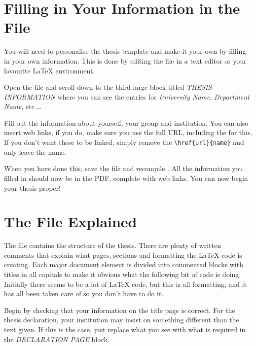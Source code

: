 
\section{Filling in Your Information in the  File}\label{FillingFile}

You will need to personalise the thesis template and make it your own by filling in your own information. This is done by editing the  file in a text editor or your favourite LaTeX environment.

Open the file and scroll down to the third large block titled \emph{THESIS INFORMATION} where you can see the entries for \emph{University Name}, \emph{Department Name}, etc \ldots

Fill out the information about yourself, your group and institution. You can also insert web links, if you do, make sure you use the full URL, including the  for this. If you don't want these to be linked, simply remove the \verb|\href{url}{name}| and only leave the name.

When you have done this, save the file and recompile . All the information you filled in should now be in the PDF, complete with web links. You can now begin your thesis proper!


\section{The  File Explained}

The  file contains the structure of the thesis. There are plenty of written comments that explain what pages, sections and formatting the \LaTeX{} code is creating. Each major document element is divided into commented blocks with titles in all capitals to make it obvious what the following bit of code is doing. Initially there seems to be a lot of \LaTeX{} code, but this is all formatting, and it has all been taken care of so you don't have to do it.

Begin by checking that your information on the title page is correct. For the thesis declaration, your institution may insist on something different than the text given. If this is the case, just replace what you see with what is required in the \emph{DECLARATION PAGE} block.

